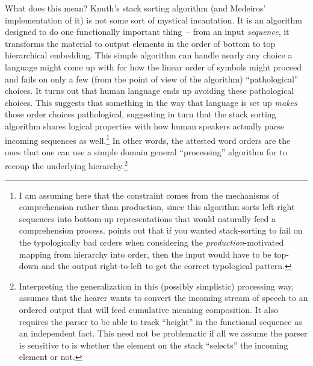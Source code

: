 \documentclass[output=paper,colorlinks,citecolor=brown]{langscibook}
\begin{document}
What does this mean? Knuth's stack sorting algorithm (and Medeiros' implementation of it) is not some sort of mystical incantation. It is an algorithm designed to do one functionally important thing~-- from an input \textit{sequence}, it transforms the material to output elements in the order of bottom to top hierarchical embedding. This simple algorithm can handle nearly any choice a language might come up with for how the linear order of symbols might proceed and fails on only a few (from the point of view of the algorithm) “pathological” choices. It turns out that human language ends up avoiding these pathological choices. This suggests  that something in the way that language is set up \textit{makes} those order choices pathological, suggesting in turn that the stack sorting algorithm shares logical properties with how human speakers actually parse incoming sequences as well.\footnote{I am assuming here that the constraint comes from the mechanisms of comprehension rather than production, since this algorithm sorts  left-right  sequences into bottom-up representations that would naturally feed a comprehension process.  \citet{abels16b} points out that if you wanted stack\hyp sorting to fail on the typologically bad orders when considering the \textit{production}\hyp motivated mapping from hierarchy into order, then the input would have to be top-down and the output right-to-left to get the correct typological pattern.}
In other words, the attested word orders are the ones that one can use a simple domain general “processing” algorithm for to recoup the underlying hierarchy.\footnote{Interpreting the  generalization in this (possibly simplistic) processing way, assumes that the hearer wants to convert the incoming stream of speech to an ordered output that will feed cumulative meaning composition. It also requires the parser to be able to track “height” in the functional sequence as an independent fact. This need not be problematic if all we assume the parser is sensitive to is whether the element on the stack “selects” the incoming element or not.}
\end{document}

